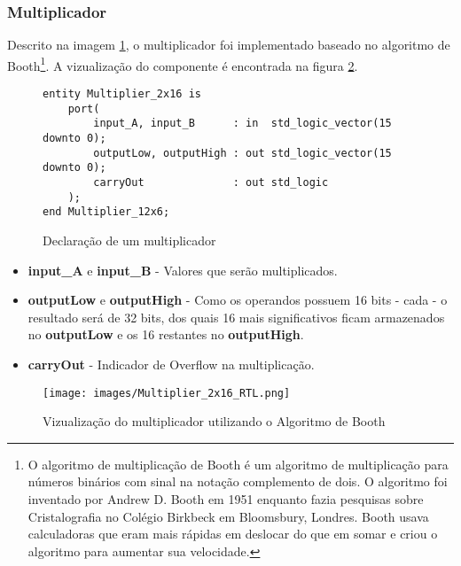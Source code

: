 \documentclass{article}
\newcommand\tab[1][0.50cm]{\hspace*{#1}}
\begin{document}
			\subsubsection[Multiplicador]{Multiplicador}
				\tab Descrito na imagem \ref{fig:Multiplier_2x16}, o multiplicador foi implementado baseado no algoritmo de Booth\footnote{O algoritmo de multiplica\c{c}\~{a}o de Booth \'{e} um algoritmo de multiplica\c{c}\~{a}o para n\'{u}meros bin\'{a}rios com sinal na nota\c{c}\~{a}o complemento de dois. O algoritmo foi inventado por Andrew D. Booth em 1951 enquanto fazia pesquisas sobre Cristalografia no Col\'{e}gio Birkbeck em Bloomsbury, Londres. Booth usava calculadoras que eram mais r\'{a}pidas em deslocar do que em somar e criou o algoritmo para aumentar sua velocidade.}. A vizualiza\c{c}\~{a}o do componente \'{e} encontrada na figura \ref{fig:Multiplier_2x16_RTL}.
				\begin{figure}[H]
					\centering
					\caption[Multiplicador]{Declara\c{c}\~{a}o de um multiplicador}
					\label{fig:Multiplier_2x16}
					\begin{lstlisting}[style=vhdl]
entity Multiplier_2x16 is
	port(
		input_A, input_B 	  : in  std_logic_vector(15 downto 0);
		outputLow, outputHigh : out std_logic_vector(15 downto 0);
		carryOut 			  : out std_logic
	);
end Multiplier_12x6;
					\end{lstlisting}
				\end{figure}
				\begin{itemize}
					\item \textbf{input\_A} e \textbf{input\_B} - Valores que ser\~{a}o multiplicados.
					\item \textbf{outputLow} e \textbf{outputHigh} - Como os operandos possuem 16 bits - cada - o resultado ser\'{a} de 32 bits, dos quais 16 mais significativos ficam armazenados no \textbf{outputLow} e os 16 restantes no \textbf{outputHigh}.
					\item \textbf{carryOut} - Indicador de Overflow na multiplica\c{c}\~{a}o.
				\end{itemize}
				\begin{figure}[H]
					\centering
					\caption[Vizualiza\c{c}\~{a}o do multiplicador]{Vizualiza\c{c}\~{a}o do multiplicador utilizando o Algoritmo de Booth}
					\label{fig:Multiplier_2x16_RTL}
					\texttt{[image: images/Multiplier\_2x16\_RTL.png]}
				\end{figure}
			
\end{document}
